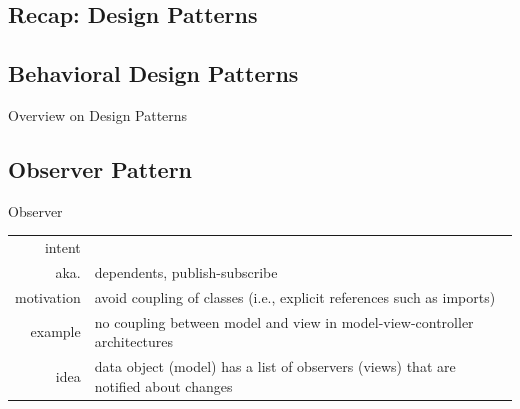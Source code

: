 \subsection{Recap: Design Patterns}
\slideDesignPatterns



\subsection{Behavioral Design Patterns}
\begin{frame}[label=behavioralpatterns]{Overview on Design Patterns \mytitlesource{\gof}}
	\centering{}
\end{frame}

\subsection{Observer Pattern}
\begin{frame}{\insertsubsection} %
	\begin{fancycolumns}
		\begin{definition}{Observer \mysource{\gof}}
			\setlength\tabcolsep{1mm}
			\begin{tabularx}{\textwidth}{rX}
				intent     & \mycite{Define a one-to-many dependency between objects so that when one object changes state, all its dependents are notified and updated automatically.} \\
				aka.       & dependents, publish-subscribe                                                                                                                              \\
				motivation & avoid coupling of classes (i.e., explicit references such as imports)                                                                                      \\
				example    & no coupling between model and view in model-view-controller architectures                                                                                  \\
				idea       & data object (model) has a list of observers (views) that are notified about changes
			\end{tabularx}
		\end{definition}
		\nextcolumn
	\end{fancycolumns}
\end{frame}

